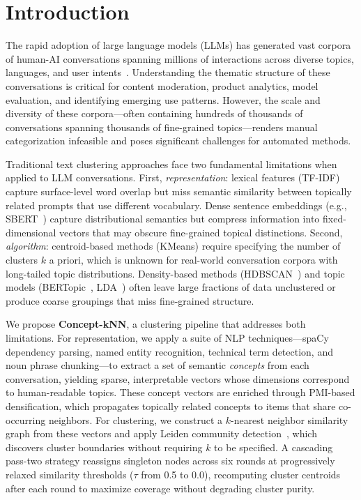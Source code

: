 \documentclass[conference]{IEEEtran}
\begin{document}
\section{Introduction}

The rapid adoption of large language models (LLMs) has generated vast corpora of human-AI conversations spanning millions of interactions across diverse topics, languages, and user intents~\cite{zheng2024lmsys, sharegpt}. Understanding the thematic structure of these conversations is critical for content moderation, product analytics, model evaluation, and identifying emerging use patterns. However, the scale and diversity of these corpora---often containing hundreds of thousands of conversations spanning thousands of fine-grained topics---renders manual categorization infeasible and poses significant challenges for automated methods.

Traditional text clustering approaches face two fundamental limitations when applied to LLM conversations. First, \textit{representation}: lexical features (TF-IDF) capture surface-level word overlap but miss semantic similarity between topically related prompts that use different vocabulary. Dense sentence embeddings (e.g., SBERT~\cite{reimers2019sbert}) capture distributional semantics but compress information into fixed-dimensional vectors that may obscure fine-grained topical distinctions. Second, \textit{algorithm}: centroid-based methods (KMeans) require specifying the number of clusters $k$ a priori, which is unknown for real-world conversation corpora with long-tailed topic distributions. Density-based methods (HDBSCAN~\cite{campello2013hdbscan}) and topic models (BERTopic~\cite{grootendorst2022bertopic}, LDA~\cite{blei2003lda}) often leave large fractions of data unclustered or produce coarse groupings that miss fine-grained structure.

We propose \textbf{Concept-kNN}, a clustering pipeline that addresses both limitations. For representation, we apply a suite of NLP techniques---spaCy dependency parsing, named entity recognition, technical term detection, and noun phrase chunking---to extract a set of semantic \textit{concepts} from each conversation, yielding sparse, interpretable vectors whose dimensions correspond to human-readable topics. These concept vectors are enriched through PMI-based densification, which propagates topically related concepts to items that share co-occurring neighbors. For clustering, we construct a $k$-nearest neighbor similarity graph from these vectors and apply Leiden community detection~\cite{traag2019leiden}, which discovers cluster boundaries without requiring $k$ to be specified. A cascading pass-two strategy reassigns singleton nodes across six rounds at progressively relaxed similarity thresholds ($\tau$ from 0.5 to 0.0), recomputing cluster centroids after each round to maximize coverage without degrading cluster purity.
\end{document}
